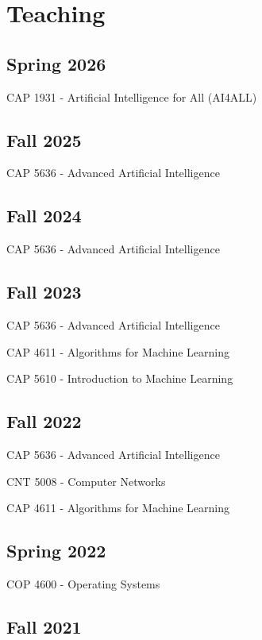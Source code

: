 \section{Teaching}

\subsection*{Spring 2026}

CAP 1931 - Artificial Intelligence for All (AI4ALL)


\subsection*{Fall 2025}

CAP 5636 - Advanced Artificial Intelligence

\subsection*{Fall 2024}

CAP 5636 - Advanced Artificial Intelligence

\subsection*{Fall 2023}

CAP 5636 - Advanced Artificial Intelligence

CAP 4611 - Algorithms for Machine Learning

CAP 5610 - Introduction to Machine Learning

\subsection*{Fall 2022}

CAP 5636 - Advanced Artificial Intelligence

CNT 5008 - Computer Networks

CAP 4611 - Algorithms for Machine Learning

\subsection*{Spring 2022}

COP 4600 - Operating Systems

\subsection*{Fall 2021}

